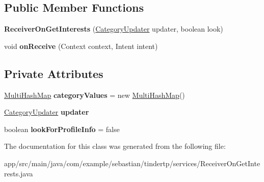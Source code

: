 \subsection*{Public Member Functions}
\begin{DoxyCompactItemize}
\item 
{\bfseries Receiver\+On\+Get\+Interests} (\hyperlink{interfacecom_1_1example_1_1sebastian_1_1tindertp_1_1Interfaces_1_1CategoryUpdater}{Category\+Updater} updater, boolean look)\hypertarget{classcom_1_1example_1_1sebastian_1_1tindertp_1_1services_1_1ReceiverOnGetInterests_a1c6693804f8ebfe6e3bb2f0c51ab4de3}{}\label{classcom_1_1example_1_1sebastian_1_1tindertp_1_1services_1_1ReceiverOnGetInterests_a1c6693804f8ebfe6e3bb2f0c51ab4de3}

\item 
void {\bfseries on\+Receive} (Context context, Intent intent)\hypertarget{classcom_1_1example_1_1sebastian_1_1tindertp_1_1services_1_1ReceiverOnGetInterests_a2617638cb16a02c326c19216f5ddac71}{}\label{classcom_1_1example_1_1sebastian_1_1tindertp_1_1services_1_1ReceiverOnGetInterests_a2617638cb16a02c326c19216f5ddac71}

\end{DoxyCompactItemize}
\subsection*{Private Attributes}
\begin{DoxyCompactItemize}
\item 
\hyperlink{classcom_1_1example_1_1sebastian_1_1tindertp_1_1commonTools_1_1MultiHashMap}{Multi\+Hash\+Map} {\bfseries category\+Values} = new \hyperlink{classcom_1_1example_1_1sebastian_1_1tindertp_1_1commonTools_1_1MultiHashMap}{Multi\+Hash\+Map}()\hypertarget{classcom_1_1example_1_1sebastian_1_1tindertp_1_1services_1_1ReceiverOnGetInterests_a8c47e83a2fbb6717d366a23347f856fe}{}\label{classcom_1_1example_1_1sebastian_1_1tindertp_1_1services_1_1ReceiverOnGetInterests_a8c47e83a2fbb6717d366a23347f856fe}

\item 
\hyperlink{interfacecom_1_1example_1_1sebastian_1_1tindertp_1_1Interfaces_1_1CategoryUpdater}{Category\+Updater} {\bfseries updater}\hypertarget{classcom_1_1example_1_1sebastian_1_1tindertp_1_1services_1_1ReceiverOnGetInterests_ab0981cfbf9c8c630e913828c5f3e5eae}{}\label{classcom_1_1example_1_1sebastian_1_1tindertp_1_1services_1_1ReceiverOnGetInterests_ab0981cfbf9c8c630e913828c5f3e5eae}

\item 
boolean {\bfseries look\+For\+Profile\+Info} = false\hypertarget{classcom_1_1example_1_1sebastian_1_1tindertp_1_1services_1_1ReceiverOnGetInterests_a806d0ec214b020aff41a8f2aa4f93c17}{}\label{classcom_1_1example_1_1sebastian_1_1tindertp_1_1services_1_1ReceiverOnGetInterests_a806d0ec214b020aff41a8f2aa4f93c17}

\end{DoxyCompactItemize}


The documentation for this class was generated from the following file\+:\begin{DoxyCompactItemize}
\item 
app/src/main/java/com/example/sebastian/tindertp/services/Receiver\+On\+Get\+Interests.\+java\end{DoxyCompactItemize}
